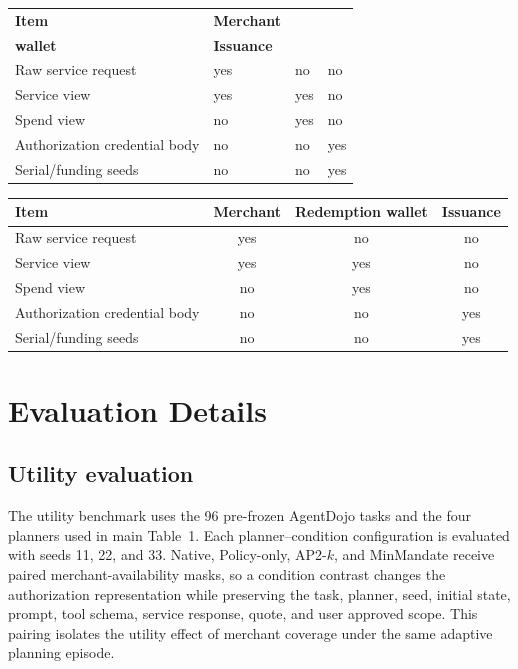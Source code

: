 \documentclass[letterpaper]{article}
\begin{document}
\begin{MMOneColumnTable}[t]
\centering
\ifdefined\MMAAAITwoColumn
\small
\setlength{\tabcolsep}{2pt}
\begin{tabularx}{\columnwidth}{@{}
  >{\raggedright\arraybackslash}X
  >{\centering\arraybackslash}p{}
  >{\centering\arraybackslash}p{}
  >{\centering\arraybackslash}p{}@{}}
\toprule
\textbf{Item} & \textbf{Merchant} &
\makecell{\textbf{Redemption}\\\textbf{wallet}} & \textbf{Issuance} \\
\midrule
Raw service request & yes & no & no \\
Service view & yes & yes & no \\
Spend view & no & yes & no \\
Authorization credential body & no & no & yes \\
Serial/funding seeds & no & no & yes \\
\bottomrule
\end{tabularx}
\else
\begin{tabular}{@{}lccc@{}}
\toprule
\textbf{Item} & \textbf{Merchant} & \textbf{Redemption wallet} & \textbf{Issuance} \\
\midrule
Raw service request & yes & no & no \\
Service view & yes & yes & no \\
Spend view & no & yes & no \\
Authorization credential body & no & no & yes \\
Serial/funding seeds & no & no & yes \\
\bottomrule
\end{tabular}
\fi
\caption{Verifier visibility for a paid call. The two wallet roles may share
backend state while retaining the issuance and redemption interfaces shown
here.}
\label{tab:verifier-visibility}
\end{MMOneColumnTable}

\section{Evaluation Details}
\label{app:running-example-visibility}

\subsection{Utility evaluation}
\label{app:utility-evaluation-details}
The utility benchmark uses the 96 pre-frozen AgentDojo tasks and the four
planners used in main Table~1. Each planner--condition configuration is
evaluated with seeds 11, 22, and 33. Native, Policy-only, AP2-\(k\), and
MinMandate receive paired merchant-availability masks, so a condition contrast
changes the authorization representation while preserving the task, planner,
seed, initial state, prompt, tool schema, service response, quote, and user
approved scope. This pairing isolates the utility effect of merchant coverage
under the same adaptive planning episode.
\end{document}
